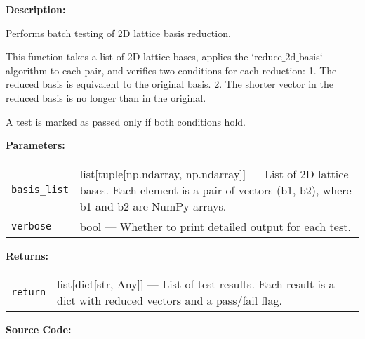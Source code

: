 \documentclass[a4paper,12pt]{article}
\begin{document}
\textbf{Description:}

Performs batch testing of 2D lattice basis reduction.

This function takes a list of 2D lattice bases, applies the `reduce$\_$2d$\_$basis` algorithm to each pair,
and verifies two conditions for each reduction:
  1. The reduced basis is equivalent to the original basis.
  2. The shorter vector in the reduced basis is no longer than in the original.

A test is marked as passed only if both conditions hold.

\vspace{1em}
\textbf{Parameters:}

\vspace{1em}
\noindent
\begin{tabular}{p{3cm} p{11cm}}
\texttt{basis\_list} & list[tuple[np.ndarray, np.ndarray]] — List of 2D lattice bases. Each element is a pair of vectors (b1, b2), where b1 and b2 are NumPy arrays. \\
\texttt{verbose} & bool — Whether to print detailed output for each test. \\
\end{tabular}

\vspace{1em}
\noindent
\textbf{Returns:}

\begin{tabular}{p{3cm} p{11cm}}
\texttt{return} & list[dict[str, Any]] — List of test results. Each result is a dict with reduced vectors and a pass/fail flag. \\
\end{tabular}

\vspace{1em}
\textbf{Source Code:}
\end{document}
